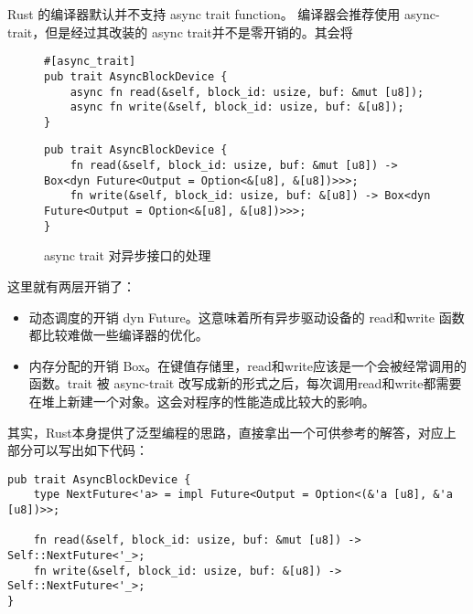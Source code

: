Rust 的编译器默认并不支持 async trait function。 编译器会推荐使用 async-trait，但是经过其改装的 async trait并不是零开销的。其会将


\begin{figure}[htbp]
    \figureCapSet
	\centering
	\begin{minipage}{0.49\linewidth}%
		\centering
        \begin{lstlisting}[frame=none]
#[async_trait]
pub trait AsyncBlockDevice {
    async fn read(&self, block_id: usize, buf: &mut [u8]);
    async fn write(&self, block_id: usize, buf: &[u8]);
}
        \end{lstlisting}
	\end{minipage}
    \hfill
	\begin{minipage}{0.49\linewidth}
		\centering
        \begin{lstlisting}[frame=none]
pub trait AsyncBlockDevice {
    fn read(&self, block_id: usize, buf: &mut [u8]) -> Box<dyn Future<Output = Option<&[u8], &[u8])>>>;
    fn write(&self, block_id: usize, buf: &[u8]) -> Box<dyn Future<Output = Option<&[u8], &[u8])>>>;
}
        \end{lstlisting}
	\end{minipage}
    \caption{async trait 对异步接口的处理}
\end{figure}


这里就有两层开销了：

\begin{itemize}
    \item 动态调度的开销 dyn Future。这意味着所有异步驱动设备的 read和write 函数都比较难做一些编译器的优化。
    \item 内存分配的开销 Box。在键值存储里，read和write应该是一个会被经常调用的函数。trait 被 async-trait 改写成新的形式之后，每次调用read和write都需要在堆上新建一个对象。这会对程序的性能造成比较大的影响。
\end{itemize}
其实，Rust本身提供了泛型编程的思路，直接拿出一个可供参考的解答，对应上部分可以写出如下代码：


\begin{lstlisting}[caption = AsyncBlockDevice的泛型异步接口]
pub trait AsyncBlockDevice {
    type NextFuture<'a> = impl Future<Output = Option<(&'a [u8], &'a [u8])>>;

    fn read(&self, block_id: usize, buf: &mut [u8]) -> Self::NextFuture<'_>;
    fn write(&self, block_id: usize, buf: &[u8]) -> Self::NextFuture<'_>;
}
\end{lstlisting}


